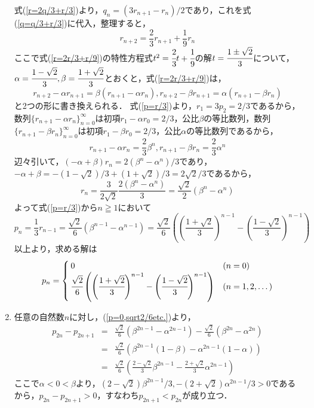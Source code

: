 \documentclass[../main]{subfiles}
\begin{document}
\begin{enumerate}[(1)]
			式(\ref{r=2q/3+r/3})より，$q_n=(3r_{n+1}-r_n)/2$であり，これを式(\ref{q=q/3+r/3})に代入，整理すると，
			\begin{equation}
				\label{r=2r/3+r/9}
				r_{n+2}=\frac{2}{3}r_{n+1}+\frac{1}{9}r_n
			\end{equation}
			ここで式(\ref{r=2r/3+r/9})の特性方程式$t^2=\cfrac{2}{3}t+\cfrac{1}{9}$の解$t=\cfrac{1\pm \sqrt{2}}{3}$について，$\alpha=\cfrac{1-\sqrt{2}}{3},\beta=\cfrac{1+\sqrt{2}}{3}$とおくと，式(\ref{r=2r/3+r/9})は，
			\[
				r_{n+2}-\alpha r_{n+1}=\beta (r_{n+1}-\alpha r_n),
				r_{n+2}-\beta r_{n+1}=\alpha (r_{n+1}-\beta r_n)
			\]
			と2つの形に書き換えられる．
			式(\ref{p=r/3})より，$r_1=3p_2=2/3$であるから，数列$\{r_{n+1}-\alpha r_n\}_{n=0}^{\infty}$は初項$r_1-\alpha r_0=2/3$，公比$\beta$の等比数列，数列$\{r_{n+1}-\beta r_n\}_{n=0}^{\infty}$は初項$r_1-\beta r_0=2/3$，公比$\alpha$の等比数列であるから，
			\[
				r_{n+1}-\alpha r_n=\frac{2}{3}\beta^n,
				r_{n+1}-\beta r_n=\frac{2}{3}\alpha^n
			\]
			辺々引いて，$(-\alpha+\beta)r_n=2(\beta^n-\alpha^n)/3$であり，$-\alpha+\beta=-(1-\sqrt{2})/3+(1+\sqrt{2})/3=2\sqrt{2}/3$であるから，
			\[
				r_n=\frac{3}{2\sqrt{2}}\frac{2(\beta^n-\alpha^n)}{3}=\frac{\sqrt{2}}{2}(\beta^n-\alpha^n)
			\]
			よって式(\ref{p=r/3})から$n\geqq1$において
			\[
				p_n=\frac{1}{3}r_{n-1}
				=\frac{\sqrt{2}}{6}(\beta^{n-1}-\alpha^{n-1})
				=\frac{\sqrt{2}}{6}\left(\left(\frac{1+\sqrt{2}}{3}\right)^{n-1}-\left(\frac{1-\sqrt{2}}{3}\right)^{n-1}\right)
			\]
			以上より，求める解は
			\begin{equation}
				\label{p=0,sqrt2/6etc.}
			  p_n = \begin{cases}
			    0 & (n=0) \\
			    \cfrac{\sqrt{2}}{6}\left(\left(\cfrac{1+\sqrt{2}}{3}\right)^{n-1}-\left(\cfrac{1-\sqrt{2}}{3}\right)^{n-1}\right) & (n=1,2,\dots)
			  \end{cases}
			\end{equation}
\item 任意の自然数$n$に対し，(\ref{p=0,sqrt2/6etc.})より，
			\begin{eqnarray*}
				p_{2n}-p_{2n+1}&=&\frac{\sqrt{2}}{6}(\beta^{2n-1}-\alpha^{2n-1})-\frac{\sqrt{2}}{6}(\beta^{2n}-\alpha^{2n})\\
				&=&\frac{\sqrt{2}}{6}(\beta^{2n-1}(1-\beta)-\alpha^{2n-1}(1-\alpha))\\
				&=&\frac{\sqrt{2}}{6}\left(\frac{2-\sqrt{2}}{3}\beta^{2n-1}-\frac{2+\sqrt{2}}{3}\alpha^{2n-1}\right)
			\end{eqnarray*}
			ここで$\alpha<0<\beta$より，$(2-\sqrt{2})\beta^{2n-1}/3,-(2+\sqrt{2})\alpha^{2n-1}/3>0$であるから，$p_{2n}-p_{2n+1}>0$，すなわち$p_{2n+1}<p_{2n}$が成り立つ．
			

\end{enumerate}
\end{document}
